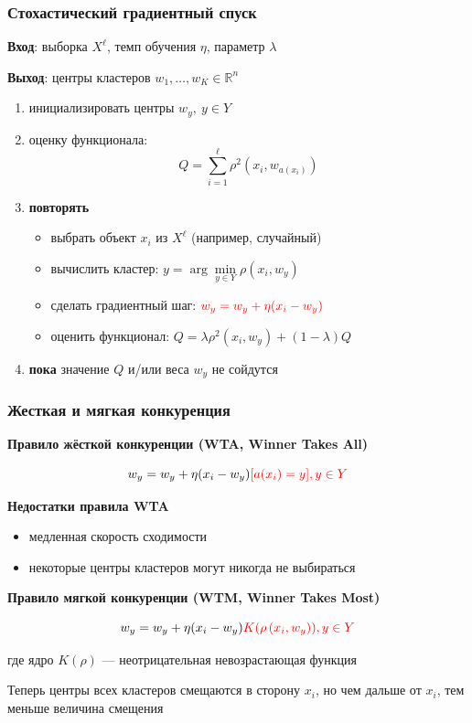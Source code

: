 \documentclass[fullscreen=true, bookmarks=true, hyperref={pdfencoding=unicode}]{beamer}
\begin{document}
\begin{frame}
  \frametitle{Стохастический градиентный спуск}

  {\bf Вход}: выборка $X^\ell$, темп обучения $\eta$, параметр $\lambda$

  {\bf Выход}: центры кластеров $w_1, \dots, w_K \in \mathbb{R}^n$

  \begin{enumerate}
    \item инициализировать центры $w_y,\ y \in Y$
    \item оценку функционала: $${Q} = \sum\limits_{i=1}^\ell \rho^2(x_i, w_{a(x_i)}) $$
    \item {\bf повторять}
      \begin{itemize}
        \item выбрать объект $x_i$ из $X^\ell$ (например, случайный)
        \item вычислить кластер: $y = \arg\min\limits_{y \in Y} \rho(x_i, w_y)$
        \item сделать градиентный шаг: $\color{red}{w_y = w_y + \eta (x_i - w_y)}$
        \item оценить функционал: ${Q} = \lambda \rho^2(x_i, w_y) + (1 - \lambda) {Q}$
      \end{itemize}
    \item {\bf пока} значение ${Q}$ и/или веса $w_y$ не сойдутся
  \end{enumerate}
\end{frame}


\begin{frame}
  \frametitle{Жесткая и мягкая конкуренция}

  {\bf Правило жёсткой конкуренции (WTA, Winner Takes All)}

  $$w_y = w_y + \eta(x_i-w_y)\color{red}{[a(x_i)=y]}, y \in Y$$

  {\bf Недостатки правила WTA}
  \begin{itemize}
    \item медленная скорость сходимости
    \item некоторые центры кластеров могут никогда не выбираться
  \end{itemize}

  {\bf Правило мягкой конкуренции (WTM, Winner Takes Most)}

  $$w_y = w_y + \eta(x_i-w_y)\color{red}{K(\rho\left(x_i, w_y)\right)}, y \in Y$$

  где ядро $K(\rho)$ — неотрицательная невозрастающая функция

  Теперь центры всех кластеров смещаются в сторону $x_i$, но чем дальше от $x_i$, тем меньше величина смещения
\end{frame}
\end{document}
